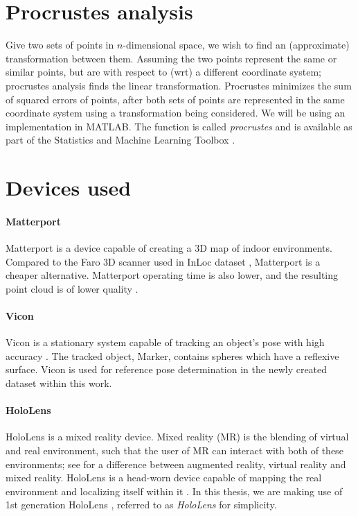\documentclass[twoside]{ctuthesis}
\theoremstyle{plain}
\theoremstyle{definition}
\theoremstyle{note}
\begin{document}
\section{Procrustes analysis}
Give two sets of points in $n$-dimensional space, we wish to find an (approximate) transformation between them. Assuming the two points represent the same or similar points, but are with respect to (wrt) a different coordinate system; procrustes analysis \cite{procrustes} finds the linear transformation. Procrustes minimizes the sum of squared errors of points, after both sets of points are represented in the same coordinate system using a transformation being considered. We will be using an implementation in MATLAB. The function is called \emph{procrustes} and is available as part of the Statistics and Machine Learning Toolbox \cite{MatlabStats}.

\section{Devices used}
\paragraph{Matterport}
Matterport is a device capable of creating a 3D map of indoor environments. Compared to the Faro 3D scanner used in InLoc dataset \cite{taira2018inloc}, Matterport is a cheaper alternative. Matterport operating time is also lower, and the resulting point cloud is of lower quality \cite{wijmans17rgbd}.

\paragraph{Vicon}
Vicon is a stationary system capable of tracking an object's pose with high accuracy \cite{Vicon}. The tracked object, Marker, contains spheres which have a reflexive surface. Vicon is used for reference pose determination in the newly created dataset within this work.

\paragraph{HoloLens}
HoloLens is a mixed reality device. Mixed reality (MR) is the blending of virtual and real environment, such that the user of MR can interact with both of these environments; see \cite{VR_AR_MR_taxonomy} for a difference between augmented reality, virtual reality and mixed reality. HoloLens is a head-worn device capable of mapping the real environment and localizing itself within it \cite{HoloLensEvaluation}. In this thesis, we are making use of 1st generation HoloLens \cite{HoloLens1stGen}, referred to as \emph{HoloLens} for simplicity.
\end{document}
